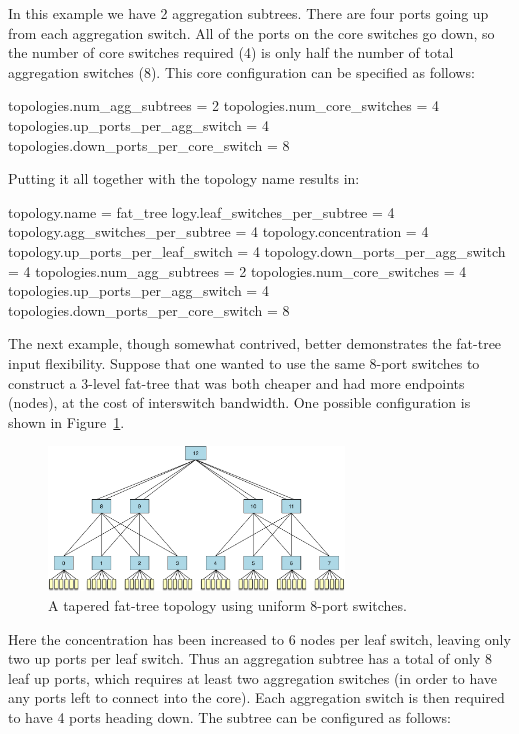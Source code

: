 In this example we have 2 aggregation subtrees.
There are four ports going up from each aggregation switch.
All of the ports on the core switches go down, so the number of core switches required (4) is only half the number of total aggregation switches (8).
This core configuration can be specified as follows:

\begin{ViFile}
topologies.num_agg_subtrees = 2
topologies.num_core_switches = 4
topologies.up_ports_per_agg_switch = 4
topologies.down_ports_per_core_switch = 8
\end{ViFile}

Putting it all together with the topology name results in:

\begin{ViFile}
topology.name = fat_tree
logy.leaf_switches_per_subtree = 4
topology.agg_switches_per_subtree = 4
topology.concentration = 4
topology.up_ports_per_leaf_switch = 4
topology.down_ports_per_agg_switch = 4
topologies.num_agg_subtrees = 2
topologies.num_core_switches = 4
topologies.up_ports_per_agg_switch = 4
topologies.down_ports_per_core_switch = 8
\end{ViFile}

The next example, though somewhat contrived, better demonstrates the fat-tree input flexibility.
Suppose that one wanted to use the same 8-port switches to construct a 3-level fat-tree that was both cheaper and had more endpoints (nodes), at the cost of interswitch bandwidth.
One possible configuration is shown in Figure~\ref{fig:topologies:taperedfattree}.

\begin{figure}[h!]
\centering
\includegraphics[width=0.7\textwidth]{figures/topologies/fattree4-tapered.pdf}
\caption{A tapered fat-tree topology using uniform 8-port switches.}
\label{fig:topologies:taperedfattree}
\end{figure}

Here the concentration has been increased to 6 nodes per leaf switch, leaving only two up ports per leaf switch.
Thus an aggregation subtree has a total of only 8 leaf up ports, which requires at least two aggregation switches (in order to have any ports left to connect into the core).
Each aggregation switch is then required to have 4 ports heading down.
The subtree can be configured as follows:

